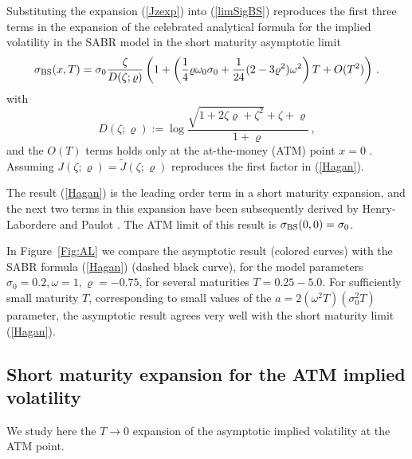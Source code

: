 \documentclass[11pt]{article}
\numberwithin{equation}{section}
\theoremstyle{plain}
\begin{document}
Substituting the expansion (\ref{Jzexp}) into (\ref{limSigBS}) reproduces the 
first three terms in the expansion of the celebrated analytical formula for
the implied volatility in the SABR model in the
short maturity asymptotic limit \cite{SABR}
\begin{equation}\label{Hagan}
\sigma_{\rm BS}(x,T) = \sigma_0 \frac{\zeta}{D(\zeta;\varrho)} 
\left(1 + \left( \frac14 \varrho \omega_0 \sigma_0 + \frac{1}{24} (2-3\varrho^2)
\omega^2 \right) T 
+ O(T^2)\right) \,.
\end{equation}
with
\begin{equation}
D(\zeta;\varrho) := 
\log \frac{\sqrt{1+2\zeta\varrho + \zeta^2} + \zeta + \varrho}{1+\varrho}\,,
\end{equation}
and the $O(T)$ terms holds only at the at-the-money (ATM) point $x=0$ 
\cite{Paulot}. Assuming $J(\zeta;\varrho) = \tilde J(\zeta;\varrho)$ reproduces 
the first factor in (\ref{Hagan}).

The result (\ref{Hagan}) is the
leading order term in a short maturity expansion, and the next two
terms in this expansion have been subsequently derived by 
Henry-Labordere \cite{HLbook} and Paulot \cite{PaulotSABR}. 
The ATM limit of this result is $\sigma_{\rm BS}(0,0) = \sigma_0$. 

In Figure~\ref{Fig:AL} we compare the asymptotic result (colored curves) 
with the SABR formula (\ref{Hagan}) (dashed black curve), for the model 
parameters $\sigma_0=0.2,\omega=1,\varrho=-0.75$, for several maturities
$T=0.25 - 5.0$. For sufficiently small maturity $T$, corresponding to 
small values of the $a=2(\omega^2 T)(\sigma_0^2 T)$ parameter,
the asymptotic result agrees very well with the short maturity limit (\ref{Hagan}).




\subsection{Short maturity expansion for the ATM implied volatility}
\label{sec:6.2}


We study here the $T\to 0$ expansion of the asymptotic implied volatility 
at the ATM point.
\end{document}
